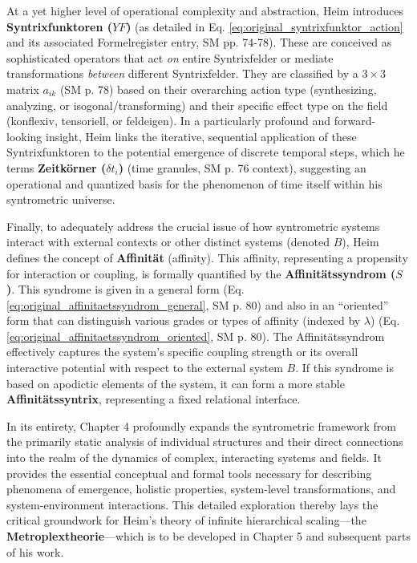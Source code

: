 \documentclass[12pt]{article}
\newcommand{\q}[1]{\enquote{#1}}
\newcommand{\syntrixfunktor}{YF}
\newcommand{\zeitkorn}{\delta t_i}
\newcommand{\affinitaetssyndrom}{S}
\begin{document}
At a yet higher level of operational complexity and abstraction, Heim introduces \textbf{Syntrixfunktoren (\( \syntrixfunktor \))} (as detailed in Eq. \eqref{eq:original_syntrixfunktor_action} and its associated Formelregister entry, SM pp. 74-78). These are conceived as sophisticated operators that act \textit{on} entire Syntrixfelder or mediate transformations \textit{between} different Syntrixfelder. They are classified by a \( 3 \times 3 \) matrix \( a_{ik} \) (SM p. 78) based on their overarching action type (synthesizing, analyzing, or isogonal/transforming) and their specific effect type on the field (konflexiv, tensoriell, or feldeigen). In a particularly profound and forward-looking insight, Heim links the iterative, sequential application of these Syntrixfunktoren to the potential emergence of discrete temporal steps, which he terms \textbf{Zeitkörner (\(\zeitkorn\))} (time granules, SM p. 76 context), suggesting an operational and quantized basis for the phenomenon of time itself within his syntrometric universe.

Finally, to adequately address the crucial issue of how syntrometric systems interact with external contexts or other distinct systems (denoted \( B \)), Heim defines the concept of \textbf{Affinität} (affinity). This affinity, representing a propensity for interaction or coupling, is formally quantified by the \textbf{Affinitätssyndrom (\( \affinitaetssyndrom \))}. This syndrome is given in a general form (Eq. \eqref{eq:original_affinitaetssyndrom_general}, SM p. 80) and also in an \q{oriented} form that can distinguish various grades or types of affinity (indexed by \( \lambda \)) (Eq. \eqref{eq:original_affinitaetssyndrom_oriented}, SM p. 80). The Affinitätssyndrom effectively captures the system's specific coupling strength or its overall interactive potential with respect to the external system \( B \). If this syndrome is based on apodictic elements of the system, it can form a more stable \textbf{Affinitätssyntrix}, representing a fixed relational interface.

In its entirety, Chapter 4 profoundly expands the syntrometric framework from the primarily static analysis of individual structures and their direct connections into the realm of the dynamics of complex, interacting systems and fields. It provides the essential conceptual and formal tools necessary for describing phenomena of emergence, holistic properties, system-level transformations, and system-environment interactions. This detailed exploration thereby lays the critical groundwork for Heim's theory of infinite hierarchical scaling—the \textbf{Metroplextheorie}—which is to be developed in Chapter 5 and subsequent parts of his work.
\end{document}
